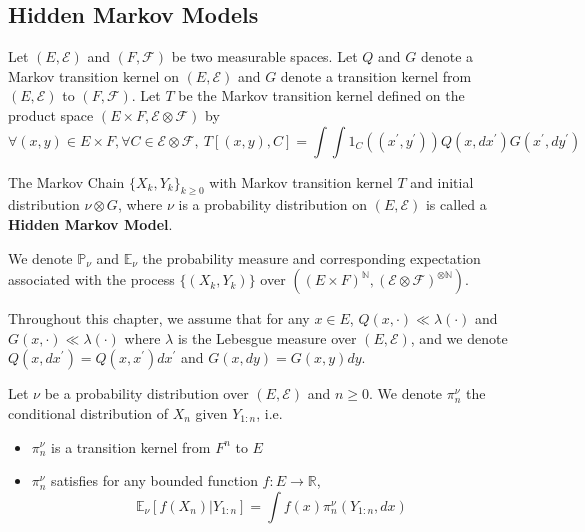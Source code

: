 \subsection{Hidden Markov Models}
\begin{definition}
Let $(E, \mathcal E)$ and $(F, \mathcal F)$ be two measurable spaces. Let $Q$ and $G$ denote a Markov transition kernel on $(E, \mathcal E)$ and $G$ denote a transition kernel from $(E, \mathcal E)$ to $(F, \mathcal F)$. Let $T$ be the Markov transition kernel defined on the product space $(E \times F, \mathcal E \otimes \mathcal F)$ by
\begin{equation}
    \forall (x, y) \in E\times F, \forall C\in\mathcal E \otimes\mathcal F, ~T\left[(x, y), C\right] = \int \int 1_C((x^\prime, y^\prime)) Q(x, dx^\prime) G(x^\prime, dy^\prime)
\end{equation}

The Markov Chain $\lbrace X_k, Y_k \rbrace_{k\geq 0}$ with Markov transition kernel $T$ and initial distribution $\nu \otimes G$, where $\nu$ is a probability distribution on $(E, \mathcal E)$ is called a \textbf{Hidden Markov Model}.

We denote $\mathbb P_\nu$ and $\mathbb E_\nu$ the probability measure and corresponding expectation associated with the process $\lbrace (X_k, Y_k)\rbrace$ over $\left((E\times F)^{\mathbb N}, (\mathcal E \otimes \mathcal F)^{\otimes \mathbb N}\right)$.
\end{definition}

Throughout this chapter, we assume that for any $x\in E$, $Q(x, \cdot) \ll \lambda(\cdot)$ and $G(x, \cdot) \ll \lambda(\cdot)$ where $\lambda$ is the Lebesgue measure over $(E, \mathcal E)$, and we denote $Q(x, dx^\prime) = Q(x, x^\prime)dx^\prime$ and $G(x, dy)= G(x, y)dy$.


\begin{definition}
Let $\nu$ be a probability distribution over $(E, \mathcal E)$ and $n \geq 0$. We denote $\pi_n^\nu$ the conditional distribution of $X_n$ given $Y_{1:n}$, i.e.
\begin{itemize}
    \item $\pi_n^\nu$ is a transition kernel from $F^n$ to $E$
    \item $\pi_n^\nu$ satisfies for any bounded function $f: E \to \mathbb R$,
    \begin{equation}
        \mathbb E_\nu \left[ f(X_n) \vert Y_{1:n}\right] = \int f(x)\pi^\nu_n(Y_{1:n}, dx)
    \end{equation}
\end{itemize}
\end{definition}

